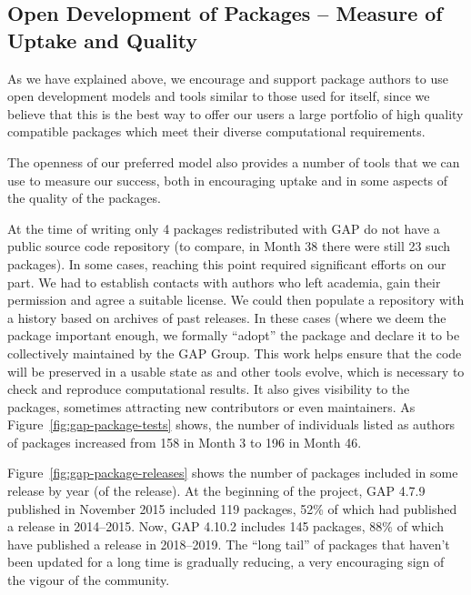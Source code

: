 \subsection{Open Development of \GAP Packages -- Measure of Uptake
  and Quality}\label{sec:uptake}

As we have explained above, we encourage and support package authors
to use open development models and tools similar to those used for
\GAP itself, since we believe that this is the best way to offer our
users a large portfolio of high quality compatible packages
which meet their diverse computational requirements.

The openness of our preferred model also provides a number of tools
that we can use to measure our success, both in encouraging uptake and
in some aspects of the quality of the packages.

At the time of writing only 4 packages redistributed with GAP do not
have a public source code repository (to compare, in Month 38 there
were still 23 such packages). In some cases, reaching this point required significant
efforts on our part. We had to establish contacts with authors who left
academia, gain their permission and agree a suitable license. We could 
then populate a repository with a history based on archives of
past releases. In these cases (where we deem the package important
enough,  we formally ``adopt'' the package and declare it to be collectively maintained
by the GAP Group. This work helps ensure that the code will be
preserved in a usable state as \GAP and other tools evolve, which is
necessary to check and reproduce computational results. It also gives
visibility to the packages, sometimes attracting new contributors or
even maintainers. As
Figure~\ref{fig:gap-package-tests} shows, the number of individuals
listed as authors of \GAP packages
increased from 158 in Month 3 to 196
in Month 46.

Figure~\ref{fig:gap-package-releases} shows the number of \GAP packages
included in some \GAP release by year (of the release).
At the beginning of the project, GAP 4.7.9 published in November
2015 included 119 packages, 52\% of which had published a release in 2014--2015.
Now, GAP 4.10.2 includes 145 packages, 88\% of which have published a
release in 2018--2019. The ``long tail'' of packages that haven't been updated for
a long time is gradually reducing, a very encouraging sign of the
vigour of the community.

